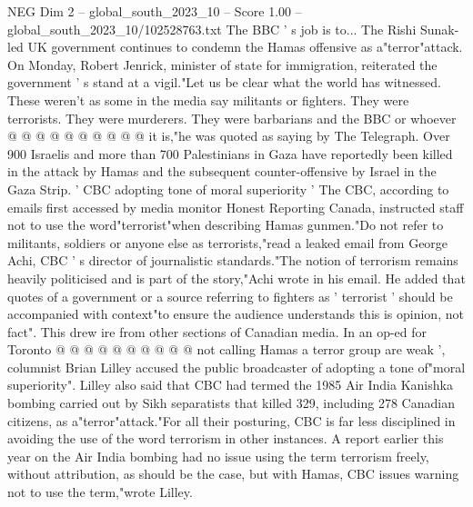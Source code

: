 \begin{textsample}{NEG Dim 2 – global\_south\_2023\_10 – Score 1.00 – global\_south\_2023\_10/102528763.txt}
The BBC ' s job is to...
The Rishi Sunak-led UK government continues to condemn the Hamas offensive as a"terror"attack.
On Monday, Robert Jenrick, minister of state for immigration, reiterated the government ' s stand at a vigil."Let us be clear what the world has witnessed.
These weren't as some in the media say militants or fighters.
They were terrorists.
They were murderers.
They were barbarians and the BBC or whoever @ @ @ @ @ @ @ @ @ @ it is,"he was quoted as saying by The Telegraph.
Over 900 Israelis and more than 700 Palestinians in Gaza have reportedly been killed in the attack by Hamas and the subsequent counter-offensive by Israel in the Gaza Strip. ' CBC adopting tone of moral superiority ' The CBC, according to emails first accessed by media monitor Honest Reporting Canada, instructed staff not to use the word"terrorist"when describing Hamas gunmen."Do not refer to militants, soldiers or anyone else as terrorists,"read a leaked email from George Achi, CBC ' s director of journalistic standards."The notion of terrorism remains heavily politicised and is part of the story,"Achi wrote in his email.
He added that quotes of a government or a source referring to fighters as ' terrorist ' should be accompanied with context"to ensure the audience understands this is opinion, not fact".
This drew ire from other sections of Canadian media.
In an op-ed for Toronto @ @ @ @ @ @ @ @ @ @ not calling Hamas a terror group are weak ', columnist Brian Lilley accused the public broadcaster of adopting a tone of"moral superiority".
Lilley also said that CBC had termed the 1985 Air India Kanishka bombing carried out by Sikh separatists that killed 329, including 278 Canadian citizens, as a"terror"attack."For all their posturing, CBC is far less disciplined in avoiding the use of the word terrorism in other instances.
A report earlier this year on the Air India bombing had no issue using the term terrorism freely, without attribution, as should be the case, but with Hamas, CBC issues warning not to use the term,"wrote Lilley.

\end{textsample}
